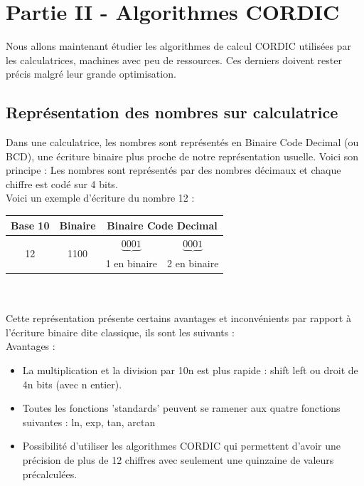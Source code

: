 \documentclass{article}
\begin{document}
\section*{Partie II - Algorithmes CORDIC}

Nous allons maintenant étudier les algorithmes de calcul CORDIC utilisées par les calculatrices, machines avec peu de ressources. Ces derniers doivent rester précis malgré leur grande optimisation.

\subsection*{Représentation des nombres sur calculatrice}

Dans une calculatrice, les nombres sont représentés en Binaire Code Decimal (ou BCD), une écriture binaire plus proche de notre représentation usuelle. Voici son principe : Les nombres sont représentés par des nombres décimaux et chaque chiffre est codé sur 4 bits. \\

Voici un exemple d'écriture du nombre 12 : \\

\begin{tabular}{ c | c | c c }
    \label{exemple_de_représentation_pour_12}
   Base 10 & Binaire &   \multicolumn{2}{c}{Binaire Code Decimal}\\ \hline
    \multirow{2}{*}{12} & \multirow{2}{*}{1100} & $\underbrace{0001}$ & $\underbrace{0001}$ \\
    & & 1 en binaire & 2 en binaire \\
 \end{tabular} \\ \\ 

Cette représentation présente certains avantages et inconvénients par rapport à l'écriture binaire dite classique, ils sont les suivants : \\

Avantages :
\begin{itemize}
    \item La multiplication et la division par 10n est plus rapide : shift left ou droit de 4n bits (avec n entier).
    \item Toutes les fonctions 'standards' peuvent se ramener aux quatre fonctions suivantes :  ln, exp, tan, arctan
    \item Possibilité d'utiliser les algorithmes CORDIC qui permettent d'avoir une précision de plus de 12 chiffres avec seulement une quinzaine de valeurs précalculées.
\end{itemize}
\end{document}
